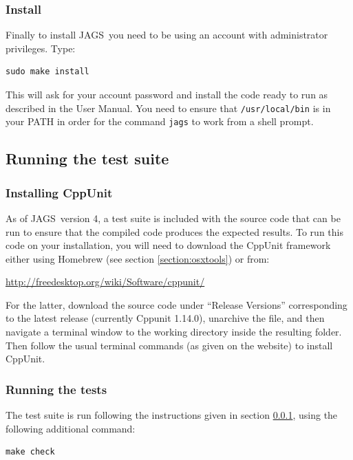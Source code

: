 \documentclass[11pt, a4paper, titlepage]{article}
\newcommand{\JAGS}{\textsf{JAGS}}
\begin{document}
\subsubsection{Install}
\label{section:osxinstall}

Finally to install \JAGS\ you need to be using an account with
administrator privileges.  Type: 

\begin{verbatim}
sudo make install
\end{verbatim} 

This will ask for your account password and install the code ready to 
run as described in the User Manual. You need to ensure that
\texttt{/usr/local/bin} is in your PATH in order for the command 
\texttt{jags} to work from a shell prompt.

\subsection{Running the test suite}
\label{section:osxtest}

\subsubsection{Installing CppUnit}

As of \JAGS\ version 4, a test suite is included with the source code that can be
run to ensure that the compiled code produces the expected results.  To run
this code on your installation, you will need to download the CppUnit framework either
using Homebrew (see section \ref{section:osxtools}) or from:

\url{http://freedesktop.org/wiki/Software/cppunit/} 

For the latter, download the source code under ``Release Versions'' corresponding 
to the latest release (currently Cppunit 1.14.0), unarchive the file, and then navigate 
a terminal window to the working directory inside the resulting folder.  Then follow 
the usual terminal commands (as given on the website) to install CppUnit.  

\subsubsection{Running the tests}

The test suite is run following the instructions given in section \ref{section:osxinstall}, 
using the following additional command:

\begin{verbatim} 
make check
\end{verbatim} 
\end{document}
